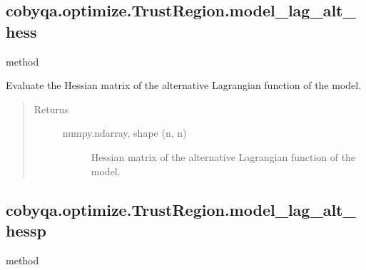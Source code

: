 \documentclass[letterpaper,10pt,english]{sphinxmanual}
\begin{document}
\begin{fulllineitems}
\begin{fulllineitems}
\end{fulllineitems}



\subsection{cobyqa.optimize.TrustRegion.model\_lag\_alt\_hess}
\label{\detokenize{refs/generated/cobyqa.optimize.TrustRegion.model_lag_alt_hess:cobyqa-optimize-trustregion-model-lag-alt-hess}}\label{\detokenize{refs/generated/cobyqa.optimize.TrustRegion.model_lag_alt_hess::doc}}
\sphinxAtStartPar
method

\begin{fulllineitems}
\label{\detokenize{refs/generated/cobyqa.optimize.TrustRegion.model_lag_alt_hess:cobyqa.optimize.TrustRegion.model_lag_alt_hess}}
\sphinxAtStartPar
Evaluate the Hessian matrix of the alternative Lagrangian function of
the model.
\begin{quote}\begin{description}
\item[{Returns}] \leavevmode\begin{description}
\item[{numpy.ndarray, shape (n, n)}] \leavevmode
\sphinxAtStartPar
Hessian matrix of the alternative Lagrangian function of the model.

\end{description}

\end{description}\end{quote}

\end{fulllineitems}



\subsection{cobyqa.optimize.TrustRegion.model\_lag\_alt\_hessp}
\label{\detokenize{refs/generated/cobyqa.optimize.TrustRegion.model_lag_alt_hessp:cobyqa-optimize-trustregion-model-lag-alt-hessp}}\label{\detokenize{refs/generated/cobyqa.optimize.TrustRegion.model_lag_alt_hessp::doc}}
\sphinxAtStartPar
method


\end{fulllineitems}
\end{document}
